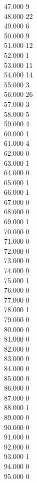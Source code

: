 { 47.000	9 \\
 48.000	22 \\
 49.000	6 \\
 50.000	9 \\
 51.000	12 \\
 52.000	1 \\
 53.000	11 \\
 54.000	14 \\
 55.000	3 \\
 56.000	26 \\
 57.000	3 \\
 58.000	5 \\
 59.000	4 \\
 60.000	1 \\
 61.000	4 \\
 62.000	0 \\
 63.000	1 \\
 64.000	0 \\
 65.000	1 \\
 66.000	1 \\
 67.000	0 \\
 68.000	0 \\
 69.000	1 \\
 70.000	0 \\
 71.000	0 \\
 72.000	0 \\
 73.000	0 \\
 74.000	0 \\
 75.000	1 \\
 76.000	0 \\
 77.000	0 \\
 78.000	1 \\
 79.000	0 \\
 80.000	0 \\
 81.000	0 \\
 82.000	0 \\
 83.000	0 \\
 84.000	0 \\
 85.000	0 \\
 86.000	0 \\
 87.000	0 \\
 88.000	1 \\
 89.000	0 \\
 90.000	0 \\
 91.000	0 \\
 92.000	0 \\
 93.000	1 \\
 94.000	0 \\
 95.000	0 \\
}
